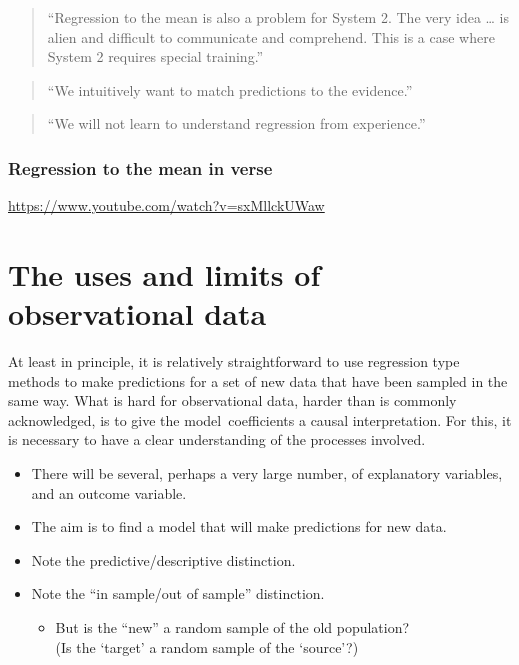 \documentclass[
  10pt,
  b5paper]{book}
\providecommand{\tightlist}{%
  \setlength{\itemsep}{0pt}\setlength{\parskip}{0pt}}
\begin{document}
\begin{quote}
``Regression to the mean is also a problem for System 2. The very idea
\ldots{} is alien and difficult to communicate and comprehend. This is a
case where System 2 requires special training.''
\end{quote}

\begin{quote}
``We intuitively want to match predictions to the evidence.''
\end{quote}

\begin{quote}
``We will not learn to understand regression from experience.''
\end{quote}

\hypertarget{regression-to-the-mean-in-verse}{%
\subsection*{Regression to the mean in verse}\label{regression-to-the-mean-in-verse}}

\url{https://www.youtube.com/watch?v=sxMllckUWaw}

\hypertarget{the-uses-and-limits-of-observational-data}{%
\chapter{The uses and limits of observational data}\label{the-uses-and-limits-of-observational-data}}

At least in principle, it is relatively straightforward to use
regression type methods to make predictions for a set of new
data that have been sampled in the same way. What is hard for
observational data, harder than is commonly acknowledged,
is to give the model~coefficients a causal interpretation.
For this, it is necessary to have a clear understanding of the
processes involved.

\begin{itemize}
\tightlist
\item
  There will be several, perhaps a very large number,
  of explanatory variables, and an outcome variable.
\item
  The aim is to find a model that will make predictions for new data.
\item
  Note the predictive/descriptive distinction.\\
\item
  Note the ``in sample/out of sample'' distinction.

  \begin{itemize}
  \tightlist
  \item
    But is the ``new'' a random sample of the old population?\\
    (Is the `target' a random sample of the `source'?)
  \end{itemize}
\end{itemize}
\end{document}
